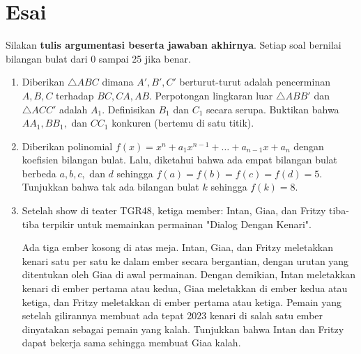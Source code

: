 \documentclass[11pt]{scrartcl}
\begin{document}
\section{Esai}
Silakan \textbf{tulis argumentasi beserta jawaban akhirnya}. Setiap soal bernilai bilangan bulat dari 0 sampai 25 jika benar.
\begin{enumerate}[resume]
    \item Diberikan $\triangle ABC$ dimana $A',B',C'$ berturut-turut adalah pencerminan $A,B,C$ terhadap $BC,CA,AB$. Perpotongan lingkaran luar $\triangle ABB'$ dan $\triangle ACC'$ adalah $A_1$. Definisikan $B_1$ dan $C_1$ secara serupa. Buktikan bahwa $AA_1,BB_1,$ dan $CC_1$ konkuren (bertemu di satu titik).

    \item Diberikan polinomial $f(x)=x^n+a_1x^{n-1}+\dots+a_{n-1}x+a_n$ dengan koefisien bilangan bulat. Lalu, diketahui bahwa ada empat bilangan bulat berbeda $a,b,c,$ dan $d$ sehingga $f(a)=f(b)=f(c)=f(d)=5$. Tunjukkan bahwa tak ada bilangan bulat $k$ sehingga $f(k)=8$.

    \item Setelah show di teater TGR48, ketiga member: Intan, Giaa, dan Fritzy tiba-tiba terpikir untuk memainkan permainan "Dialog Dengan Kenari".
    
    Ada tiga ember kosong di atas meja. Intan, Giaa, dan Fritzy meletakkan kenari satu per satu ke dalam ember secara bergantian, dengan urutan yang ditentukan oleh Giaa di awal permainan. Dengan demikian, Intan meletakkan kenari di ember pertama atau kedua, Giaa meletakkan di ember kedua atau ketiga, dan Fritzy meletakkan di ember pertama atau ketiga. Pemain yang setelah gilirannya membuat ada tepat 2023 kenari di salah satu ember dinyatakan sebagai pemain yang kalah. Tunjukkan bahwa Intan dan Fritzy dapat bekerja sama sehingga membuat Giaa kalah.
\end{enumerate}
\end{document}
